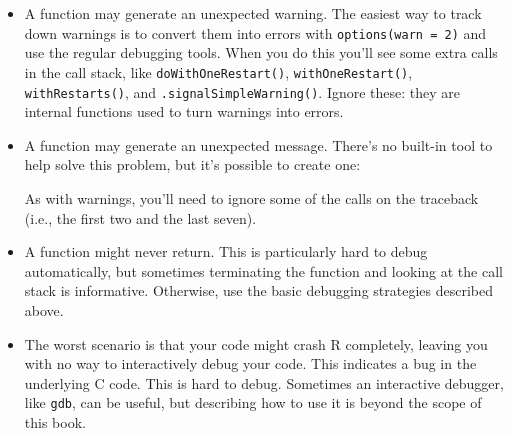 \begin{itemize}
\item
  A function may generate an unexpected warning. The easiest way to
  track down warnings is to convert them into errors with
  \texttt{options(warn\ =\ 2)} and use the regular debugging tools. When
  you do this you'll see some extra calls in the call stack, like
  \texttt{doWithOneRestart()}, \texttt{withOneRestart()},
  \texttt{withRestarts()}, and \texttt{.signalSimpleWarning()}. Ignore
  these: they are internal functions used to turn warnings into errors.
\item
  A function may generate an unexpected message. There's no built-in
  tool to help solve this problem, but it's possible to create one:

\begin{Shaded}
\begin{Highlighting}[]
\StringTok{ }
   
\NormalTok{\}}

\StringTok{ }\NormalTok{() }\NormalTok{()}
\StringTok{ }\NormalTok{() }\NormalTok{(}\NormalTok{)}
\NormalTok{()}
\NormalTok{(}\NormalTok{())}
\NormalTok{()}
\end{Highlighting}
\end{Shaded}

  As with warnings, you'll need to ignore some of the calls on the
  traceback (i.e., the first two and the last seven).
\item
  A function might never return. This is particularly hard to debug
  automatically, but sometimes terminating the function and looking at
  the call stack is informative. Otherwise, use the basic debugging
  strategies described above.
\item
  The worst scenario is that your code might crash R completely, leaving
  you with no way to interactively debug your code. This indicates a bug
  in the underlying C code. This is hard to debug. Sometimes an
  interactive debugger, like \texttt{gdb}, can be useful, but describing
  how to use it is beyond the scope of this book.


\end{itemize}
